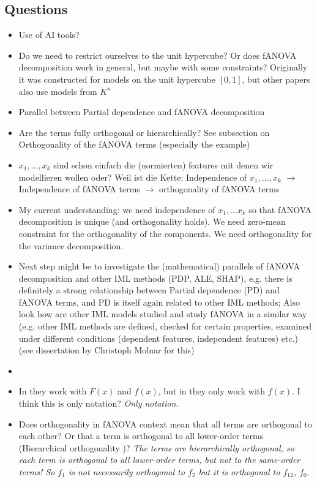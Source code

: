 \subsection*{Questions}


\begin{itemize}
    \item Use of AI tools?
    \item Do we need to restrict ourselves to the unit hypercube? Or does fANOVA decomposition work in general, but maybe with some constraints? Originally it was constructed for models on the unit hypercube $[0,1]$, but other papers also use models from $K^n$
    \item Parallel between Partial dependence \citep{jerome2001} and fANOVA decomposition
    \item Are the terms fully orthogonal or hierarchically? See subsection on Orthogonality of the fANOVA terms (especially the example)
    \item $x_1, \dots, x_k$ sind schon einfach die (normierten) features mit denen wir modellieren wollen oder? Weil ist die Kette: Independence of $x_1, \dots, x_k$ $\rightarrow$ Independence of fANOVA terms $\rightarrow$ orthogonality of fANOVA terms
    \item {\color{orange}My current understanding: we need independence of $x_1, \dots x_k$ so that fANOVA decomposition is unique (and orthogonality holds). We need zero-mean constraint for the orthogonality of the components. We need orthogonality for the variance decomposition.}
    \item Next step might be to investigate the (mathematical) parallels of fANOVA decomposition and other IML methods (PDP, ALE, SHAP), e.g. there is definitely a strong relationship between Partial dependence (PD) and fANOVA terms, and PD is itself again related to other IML methods; Also look how are other IML models studied and study fANOVA in a similar way (e.g. other IML methods are defined, checked for certain properties, examined under different conditions (dependent features, independent features) etc.) (see dissertation by Christoph Molnar for this)
    \item 
    \item In \cite{hooker_discovering_2004} they work with $F(x)$ and $f(x)$, but in \cite{sobol_global_2001} they only work with $f(x)$. I think this is only notation? \textit{Only notation.}
    \item Does orthogonality in fANOVA context mean that all terms are orthogonal to each other? Or that a term is orthogonal to all lower-order terms (\ldq Hierarchical orthogonality \rdq)? \textit{The terms are hierarchically orthogonal, so each term is orthogonal to all lower-order terms, but not to the same-order terms! So $f_1$ is not necessarily orthogonal to $f_2$ but it is orthogonal to $f_{12}$, $f_{0}$.} 

\end{itemize}
